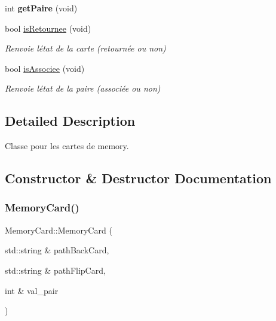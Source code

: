 \begin{DoxyCompactItemize}
\mbox{\label{class_memory_card_a61732d2d84d73b52d46506be8951d971}} 
int {\bfseries get\+Paire} (void)
\item 
\mbox{\label{class_memory_card_a7ac054746ae11df4769bd97523e304fd}} 
bool \hyperlink{class_memory_card_a7ac054746ae11df4769bd97523e304fd}{is\+Retournee} (void)
\begin{DoxyCompactList}\small\item\em Renvoie l\textquotesingle{}état de la carte (retournée ou non) \end{DoxyCompactList}\item 
\mbox{\label{class_memory_card_aba6f7bf6100c8a0972732fd94f1523dd}} 
bool \hyperlink{class_memory_card_aba6f7bf6100c8a0972732fd94f1523dd}{is\+Associee} (void)
\begin{DoxyCompactList}\small\item\em Renvoie l\textquotesingle{}état de la paire (associée ou non) \end{DoxyCompactList}\end{DoxyCompactItemize}


\subsection{Detailed Description}
Classe pour les cartes de memory. 

\subsection{Constructor \& Destructor Documentation}
\mbox{\label{class_memory_card_a64380fa5fec0bcd01a1907804989ca9c}} 
\subsubsection{\texorpdfstring{Memory\+Card()}{MemoryCard()}\hspace{0.1cm}{\footnotesize\ttfamily [1/4]}}
{\footnotesize\ttfamily Memory\+Card\+::\+Memory\+Card (\begin{DoxyParamCaption}\item[{std\+::string \&}]{path\+Back\+Card,  }\item[{std\+::string \&}]{path\+Flip\+Card,  }\item[{int \&}]{val\+\_\+pair }\end{DoxyParamCaption})}



